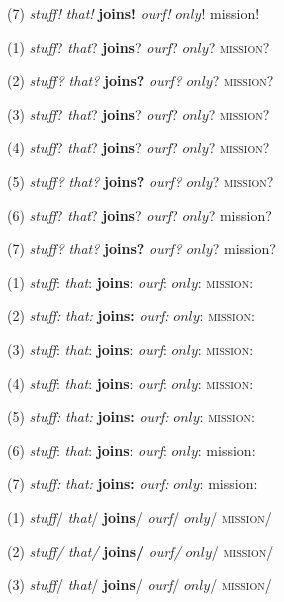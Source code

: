 \documentclass{amsart}
\begin{document}
(7) {\it stuff!} {\em that!} {\bf joins!} {\it ourf!} $only$! {\sc mission!}

\vspace{12pt}

(1) \textit{stuff}? \emph{that}? \textbf{joins}? \textit{ourf}? $only$? \textsc{mission}?

(2) \textit{stuff?} \emph{that?} \textbf{joins?} \textit{ourf?} $only$? \textsc{mission?}

(3) \textit{stuff}\/? \emph{that}\/? \textbf{joins}\/? \textit{ourf}\/? $only$? \textsc{mission}\/?

(4) \textit{stuff}? \emph{that}? \textbf{joins}? \textit{ourf}? $only$? \textsc{mission}?

(5) \textit{stuff?} \emph{that?} \textbf{joins?} \textit{ourf?} $only$? \textsc{mission?}

(6) {\it stuff}? {\em that}? {\bf joins}? {\it ourf}? $only$? {\sc mission}?

(7) {\it stuff?} {\em that?} {\bf joins?} {\it ourf?} $only$? {\sc mission?}

\vspace{12pt}

(1) \textit{stuff}: \emph{that}: \textbf{joins}: \textit{ourf}: $only$: \textsc{mission}:

(2) \textit{stuff:} \emph{that:} \textbf{joins:} \textit{ourf:} $only$: \textsc{mission:}

(3) \textit{stuff}\/: \emph{that}\/: \textbf{joins}\/: \textit{ourf}\/: $only$: \textsc{mission}\/:

(4) \textit{stuff}: \emph{that}: \textbf{joins}: \textit{ourf}: $only$: \textsc{mission}:

(5) \textit{stuff:} \emph{that:} \textbf{joins:} \textit{ourf:} $only$: \textsc{mission:}

(6) {\it stuff}: {\em that}: {\bf joins}: {\it ourf}: $only$: {\sc mission}:

(7) {\it stuff:} {\em that:} {\bf joins:} {\it ourf:} $only$: {\sc mission:}

\vspace{12pt}

(1) \textit{stuff}/ \emph{that}/ \textbf{joins}/ \textit{ourf}/ $only$/ \textsc{mission}/

(2) \textit{stuff/} \emph{that/} \textbf{joins/} \textit{ourf/} $only$/ \textsc{mission/}

(3) \textit{stuff}\// \emph{that}\// \textbf{joins}\// \textit{ourf}\// $only$/ \textsc{mission}\//
\end{document}
